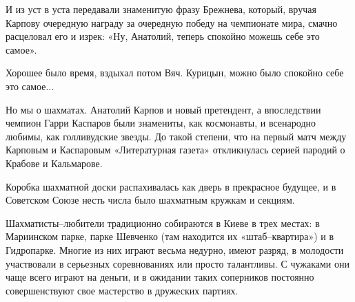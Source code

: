 И из уст в уста передавали знаменитую фразу Брежнева, который, вручая Карпову
очередную награду за очередную победу на чемпионате мира, смачно расцеловал его
и изрек: «Ну, Анатолий, теперь спокойно можешь себе это самое».

Хорошее было время, вздыхал потом Вяч. Курицын, можно было спокойно себе это
самое...

Но мы о шахматах. Анатолий Карпов и новый претендент, а впоследствии чемпион
Гарри Каспаров были знамениты, как космонавты, и всенародно любимы, как
голливудские звезды. До такой степени, что на первый матч между Карповым и
Каспаровым «Литературная газета» откликнулась серией пародий о Крабове и
Кальмарове. 

Коробка шахматной доски распахивалась как дверь в прекрасное будущее, и в
Советском Союзе несть числа было шахматным кружкам и секциям.

Шахматисты–любители традиционно собираются в Киеве в трех местах: в Мариинском
парке, парке Шевченко (там находится их «штаб–квартира») и в Гидропарке. Многие
из них играют весьма недурно, имеют разряд, в молодости участвовали в серьезных
соревнованиях или просто талантливы. С чужаками они чаще всего играют на
деньги, и в ожидании таких соперников постоянно совершенствуют свое мастерство
в дружеских партиях.

